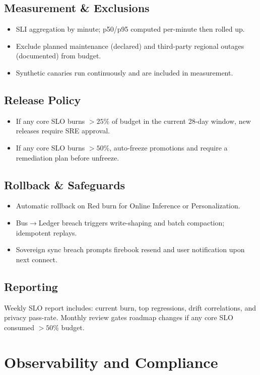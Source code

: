 \documentclass[11pt]{article}
\theoremstyle{plain}
\begin{document}
\subsection{Measurement \& Exclusions}
\begin{itemize}
  \item SLI aggregation by minute; p50/p95 computed per-minute then rolled up.
  \item Exclude planned maintenance (declared) and third-party regional outages (documented) from budget.
  \item Synthetic canaries run continuously and are included in measurement.
\end{itemize}

\subsection{Release Policy}
\begin{itemize}
  \item If any core SLO burns $>25\%$ of budget in the current 28-day window, new releases require SRE approval.
  \item If any core SLO burns $>50\%$, auto-freeze promotions and require a remediation plan before unfreeze.
\end{itemize}

\subsection{Rollback \& Safeguards}
\begin{itemize}
  \item Automatic rollback on Red burn for Online Inference or Personalization.
  \item Bus$\rightarrow$Ledger breach triggers write-shaping and batch compaction; idempotent replays.
  \item Sovereign sync breach prompts firebook resend and user notification upon next connect.
\end{itemize}

\subsection{Reporting}
Weekly SLO report includes: current burn, top regressions, drift correlations, and privacy pass-rate. Monthly review gates roadmap changes if any core SLO consumed $>50\%$ budget.


\section{Observability and Compliance}
\end{document}
